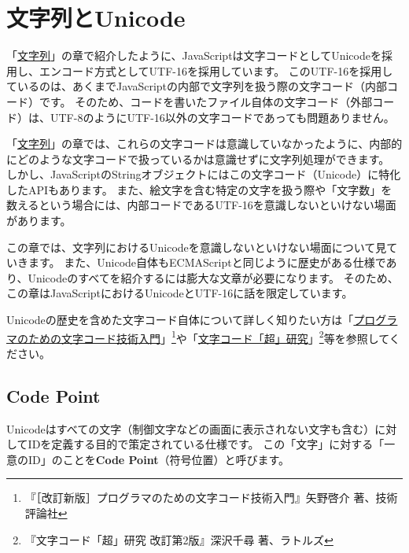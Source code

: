 \hypertarget{string-unicode}{%
\chapter{文字列とUnicode}\label{string-unicode}}
\thispagestyle{frontheadings}

「\hyperlink{string}{文字列}」の章で紹介したように、JavaScriptは文字コードとしてUnicodeを採用し、エンコード方式としてUTF-16を採用しています。
このUTF-16を採用しているのは、あくまでJavaScriptの内部で文字列を扱う際の文字コード（内部コード）です。
そのため、コードを書いたファイル自体の文字コード（外部コード）は、UTF-8のようにUTF-16以外の文字コードであっても問題ありません。

「\hyperlink{string}{文字列}」の章では、これらの文字コードは意識していなかったように、内部的にどのような文字コードで扱っているかは意識せずに文字列処理ができます。
しかし、JavaScriptのStringオブジェクトにはこの文字コード（Unicode）に特化したAPIもあります。
また、絵文字を含む特定の文字を扱う際や「文字数」を数えるという場合には、内部コードであるUTF-16を意識しないといけない場面があります。

この章では、文字列におけるUnicodeを意識しないといけない場面について見ていきます。
また、Unicode自体もECMAScriptと同じように歴史がある仕様であり、Unicodeのすべてを紹介するには膨大な文章が必要になります。
そのため、この章はJavaScriptにおけるUnicodeとUTF-16に話を限定しています。

Unicodeの歴史を含めた文字コード自体について詳しく知りたい方は「\href{https://gihyo.jp/book/2019/978-4-297-10291-3}{プログラマのための文字コード技術入門}」\footnote{『［改訂新版］プログラマのための文字コード技術入門』矢野啓介 著、技術評論社}や「\href{http://www.rutles.net/products/detail.php?product_id=298}{文字コード「超」研究}」\footnote{『文字コード「超」研究 改訂第2版』深沢千尋 著、ラトルズ}等を参照してください。

\hypertarget{code-point}{%
\section{Code Point}\label{code-point}}

Unicodeはすべての文字（制御文字などの画面に表示されない文字も含む）に対してIDを定義する目的で策定されている仕様です。
この「文字」に対する「一意のID」のことを\textbf{Code
Point}（符号位置）と呼びます。

